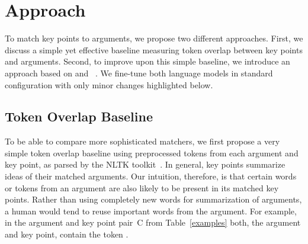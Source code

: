 \section{Approach}\label{approach}

To match key points to arguments, we propose two different approaches.
First, we discuss a simple yet effective baseline measuring token overlap between key points and arguments.
Second, to improve upon this simple baseline, we introduce an approach based on \Bert and \Roberta~\cite{DevlinCLT2019,LiuOGDJCLLZS2019}. 
We fine-tune both language models in standard configuration with only minor changes highlighted below.

\subsection{Token Overlap Baseline}
To be able to compare more sophisticated matchers, we first propose a very simple token overlap baseline using preprocessed tokens 
from each argument and key point, as parsed by the NLTK toolkit~\cite{BirdL2004}. 
In general, key points summarize ideas of their matched arguments.
Our intuition, therefore, is that certain words or tokens from an argument are also likely to be present in its matched key points.
Rather than using completely new words for summarization of arguments, a human would tend to reuse important words from the argument.
For example, in the argument and key point pair~C from Table~\ref{examples} both, the argument and key point, contain the token .

